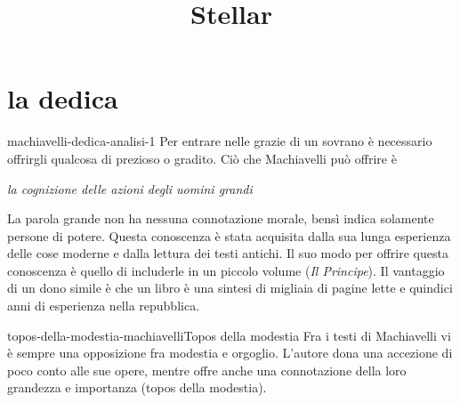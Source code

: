 \documentclass[preview]{standalone}
\begin{document}
\title{Stellar}
\genpage

\section{la dedica}

\begin{snippet}{machiavelli-dedica-analisi-1}
    Per entrare nelle grazie di un sovrano è necessario offrirgli qualcosa di prezioso o gradito.
    Ciò che Machiavelli può offrire è
    \begin{center}
        \textit{la cognizione delle azioni degli uomini grandi}
    \end{center}
    La parola grande non ha nessuna connotazione morale, bensì indica solamente
    persone di potere.
    Questa conoscenza è stata acquisita dalla sua lunga esperienza delle cose moderne
    e dalla lettura dei testi antichi.
    Il suo modo per offrire questa conoscenza è quello di includerle in un piccolo volume (\textit{Il Principe}).
    Il vantaggio di un dono simile è che un libro è una sintesi di migliaia di pagine
    lette e quindici anni di esperienza nella repubblica.
\end{snippet}

\begin{snippetnote}{topos-della-modestia-machiavelli}{Topos della modestia}
    Fra i testi di Machiavelli vi è sempre una opposizione fra modestia e orgoglio.
    L'autore dona una accezione di poco conto alle sue opere, mentre
    offre anche una connotazione della loro grandezza e importanza (topos della modestia).
\end{snippetnote}
\end{document}
